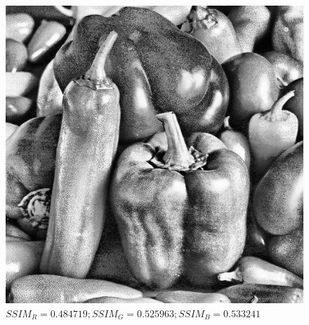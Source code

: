 \documentclass[usenames,dvipsnames]{beamer}
\begin{document}
\begin{frame}
\begin{columns}[onlytextwidth]
\begin{column}{.45\textwidth}
\begin{figure}
		  \includegraphics[width=\textwidth]{graphics/peppers_gray_hc.jpg}
		  \caption{$SSIM_R=0.484719; SSIM_G=0.525963; SSIM_B=0.533241$}
		\end{figure}
\end{column}
\end{columns}

\end{frame}  
\end{document}
